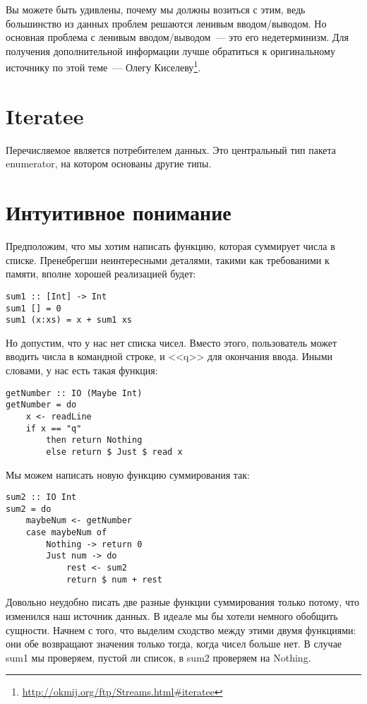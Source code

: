 \begin{remark}
Вы можете быть удивлены, почему мы должны возиться с этим, ведь большинство из данных проблем решаются ленивым вводом/выводом. Но основная проблема с ленивым вводом/выводом~--- это его недетерминизм. Для получения дополнительной информации лучше обратиться к оригинальному источнику по этой теме~--- Олегу Киселеву\footnote{\href{http://okmij.org/ftp/Streams.html\#iteratee}{http://okmij.org/ftp/Streams.html\#iteratee}}.
\end{remark}

\section{Iteratee}

Перечисляемое является потребителем данных. Это центральный тип пакета enumerator, на котором основаны другие типы.

\section{Интуитивное понимание}

Предположим, что мы хотим написать функцию, которая суммирует числа в списке. Пренебрегши неинтересными деталями, такими как требованими к памяти, вполне хорошей реализацией будет:

\begin{lstlisting}
sum1 :: [Int] -> Int
sum1 [] = 0
sum1 (x:xs) = x + sum1 xs
\end{lstlisting}

Но допустим, что у нас нет списка чисел. Вместо этого, пользователь может вводить числа в командной строке, и <<q>> для окончания ввода. Иными словами, у нас есть такая функция:

\begin{lstlisting}
getNumber :: IO (Maybe Int)
getNumber = do
    x <- readLine
    if x == "q"
        then return Nothing
        else return $ Just $ read x
\end{lstlisting}%

Мы можем написать новую функцию суммирования так:

\begin{lstlisting}
sum2 :: IO Int
sum2 = do
    maybeNum <- getNumber
    case maybeNum of
        Nothing -> return 0
        Just num -> do
            rest <- sum2
            return $ num + rest
\end{lstlisting}%

Довольно неудобно писать две разные функции суммирования только потому, что изменился наш источник данных. В идеале мы бы хотели немного обобщить сущности. Начнем с того, что выделим сходство между этими двумя функциями: они обе возвращают значения только тогда, когда чисел больше нет. В случае sum1 мы проверяем, пустой ли список, в sum2 проверяем на Nothing.

